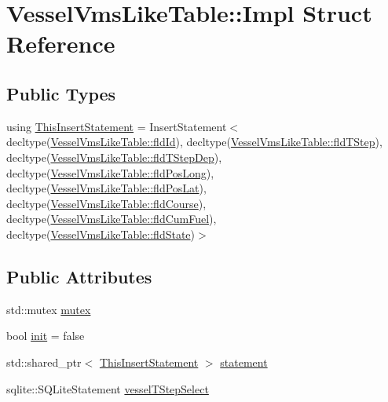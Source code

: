\hypertarget{struct_vessel_vms_like_table_1_1_impl}{}\section{Vessel\+Vms\+Like\+Table\+::Impl Struct Reference}
\label{struct_vessel_vms_like_table_1_1_impl}
\subsection*{Public Types}
\begin{DoxyCompactItemize}
\item 
using \mbox{\hyperlink{struct_vessel_vms_like_table_1_1_impl_aef1b507be7f680a656e5604c3049a99a}{This\+Insert\+Statement}} = Insert\+Statement$<$ decltype(\mbox{\hyperlink{class_vessel_vms_like_table_a87f903e5516aaccb43c1ea6e90c0a923}{Vessel\+Vms\+Like\+Table\+::fld\+Id}}), decltype(\mbox{\hyperlink{class_vessel_vms_like_table_a5e10f870c3b87126c01b1b953dea9876}{Vessel\+Vms\+Like\+Table\+::fld\+T\+Step}}), decltype(\mbox{\hyperlink{class_vessel_vms_like_table_a3d33393b14a942cca454354db1aa73a3}{Vessel\+Vms\+Like\+Table\+::fld\+T\+Step\+Dep}}), decltype(\mbox{\hyperlink{class_vessel_vms_like_table_a07f5fde6d95b76f05b95fa9f462a69d5}{Vessel\+Vms\+Like\+Table\+::fld\+Pos\+Long}}), decltype(\mbox{\hyperlink{class_vessel_vms_like_table_a115196d529d843c8f9d09cb46273ee49}{Vessel\+Vms\+Like\+Table\+::fld\+Pos\+Lat}}), decltype(\mbox{\hyperlink{class_vessel_vms_like_table_aa235f51c2df9c69e96b327193a28dfb3}{Vessel\+Vms\+Like\+Table\+::fld\+Course}}), decltype(\mbox{\hyperlink{class_vessel_vms_like_table_ad06a099f3e8d2fec045bcd990fb81650}{Vessel\+Vms\+Like\+Table\+::fld\+Cum\+Fuel}}), decltype(\mbox{\hyperlink{class_vessel_vms_like_table_a2cbcedc208e696f8f73f41bd376e420b}{Vessel\+Vms\+Like\+Table\+::fld\+State}})$>$
\end{DoxyCompactItemize}
\subsection*{Public Attributes}
\begin{DoxyCompactItemize}
\item 
std\+::mutex \mbox{\hyperlink{struct_vessel_vms_like_table_1_1_impl_a419a7a93322a5d6a75adb93801ae7a31}{mutex}}
\item 
bool \mbox{\hyperlink{struct_vessel_vms_like_table_1_1_impl_ae0cd8c366047ff5b5a085bb5b781acf7}{init}} = false
\item 
std\+::shared\+\_\+ptr$<$ \mbox{\hyperlink{struct_vessel_vms_like_table_1_1_impl_aef1b507be7f680a656e5604c3049a99a}{This\+Insert\+Statement}} $>$ \mbox{\hyperlink{struct_vessel_vms_like_table_1_1_impl_a45743178ec286f79fb2836fb5e3de3e6}{statement}}
\item 
sqlite\+::\+S\+Q\+Lite\+Statement \mbox{\hyperlink{struct_vessel_vms_like_table_1_1_impl_a8f24333e77de604f1b082c6f0b422aa7}{vessel\+T\+Step\+Select}}
\end{DoxyCompactItemize}


